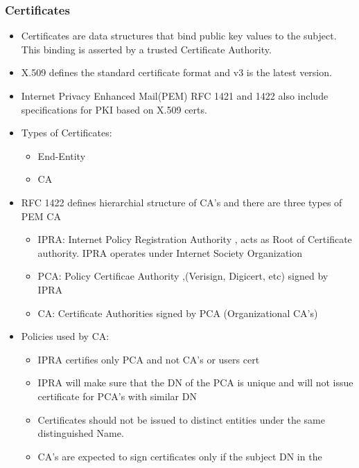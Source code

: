 \documentclass[12pt]{report}
\begin{document}
    \subsubsection {Certificates}
        \begin{itemize}
            \item Certificates are data structures that bind public key values to the subject. This binding is asserted by a trusted Certificate Authority.
            \item X.509 defines the standard certificate format and v3 is the latest version.
            \item Internet Privacy Enhanced Mail(PEM) RFC 1421 and 1422 also include specifications for PKI based on X.509 certs. 
            \item Types of Certificates:
                \begin{itemize}
                    \item End-Entity
                    \item CA
                \end{itemize}
            \item RFC 1422 defines hierarchial structure  of CA's and there are three types of PEM CA
                \begin{itemize}
                    \item IPRA: Internet Policy Registration Authority , acts as Root of Certificate authority. IPRA operates under Internet Society Organization
                    \item PCA: Policy Certificae Authority ,(Verisign, Digicert, etc) signed by IPRA
                    \item CA: Certificate Authorities signed by PCA (Organizational CA's)
                \end{itemize}
            \item Policies used by CA:
                \begin{itemize}
                    \item IPRA certifies only PCA and not CA's or users cert
                    \item IPRA will make sure that the DN of the PCA is unique and will not issue certificate for PCA's with similar DN
                    \item Certificates should not be issued to distinct entities under the same distinguished Name. 
                    \item CA's are expected to sign certificates only if the subject DN in the

\end{itemize}
\end{itemize}
\end{document}
